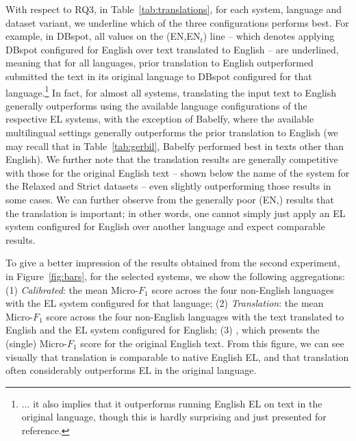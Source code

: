\documentclass{llncs}
\begin{document}

With respect to \textsc{RQ3}, in Table~\ref{tab:translations}, for each system, language and dataset variant, we underline which of the three configurations performs best. For example, in DBspot, all values on the (EN,EN$_t$) line -- which denotes applying DBspot configured for English over text translated to English -- are underlined, meaning that for all languages, prior translation to English outperformed submitted the text in its original language to DBspot configured for that language.\footnote{$\ldots$ it also implies that it outperforms running English EL on text in the original language, though this is hardly surprising and just presented for reference.}
In fact, for almost all systems, translating the input text to English generally outperforms using the available language configurations of the respective EL systems, with the exception of Babelfy, where the available multilingual settings generally outperforms the prior translation to English (we may recall that in Table~\ref{tab:gerbil}, Babelfy performed best in texts other than English). We further note that the translation results are generally competitive with those for the original English text -- shown below the name of the system for the Relaxed and Strict datasets -- even slightly outperforming those results in some cases. We can further observe from the generally poor (EN,\blank) results that the translation is important; in other words, one cannot simply just apply an EL system configured for English over another language and expect comparable results.

To give a better impression of the results obtained from the second experiment, in Figure~\ref{fig:bars}, for the selected systems, we show the following aggregations: (1) \textit{Calibrated}: the mean Micro-$F_1$ score across the four non-English languages with the EL system configured for that language; (2) \textit{Translation}: the mean Micro-$F_1$ score across the four non-English languages with the text translated to English and the EL system configured for English; (3) , which presents the (single) Micro-$F_1$ score for the original English text. From this figure, we can see visually that translation is comparable to native English EL, and that translation often considerably outperforms EL in the original language. 
\end{document}
